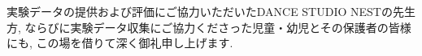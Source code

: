 \documentclass[paper]{ieicej}
\begin{document}
\ack %
実験データの提供および評価にご協力いただいたDANCE STUDIO NESTの先生方, ならびに実験データ収集にご協力くださった児童・幼児とその保護者の皆様にも, この場を借りて深く御礼申し上げます. 





\begin{biography}
\end{biography}
\end{document}
